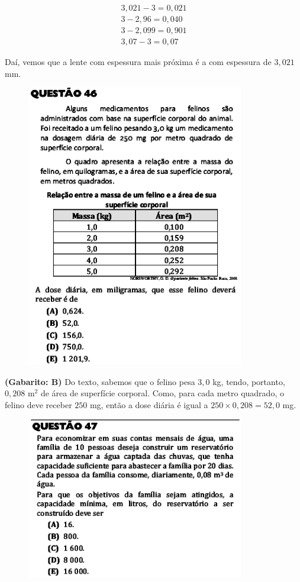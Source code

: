 \documentclass[a4paper]{article}
\begin{document}
\begin{align*}
3,021 - 3 = 0,021 \\
3 - 2,96 = 0,040 \\
3 - 2,099 = 0,901 \\
3,07 - 3 = 0,07
\end{align*}
\par\vspace{0.3cm} Daí, vemos que a lente com espessura mais próxima é a com espessura de $3,021$ mm.
\begin{figure}[H]
	\begin{center}
		\includegraphics[width=9.5cm]{L2Q46.png}
	\end{center}
\end{figure}
\par\textbf{(Gabarito: B)} Do texto, sabemos que o felino pesa $3,0$ kg, tendo, portanto, $0,208$ m$^2$ de área de superfície corporal. Como, para cada metro quadrado, o felino deve receber $250$ mg, então a dose diária é igual a $250\times 0,208 = 52,0$ mg.
\begin{figure}[H]
	\begin{center}
		\includegraphics[width=9.5cm]{L2Q47.png}
	\end{center}
\end{figure}
\end{document}
